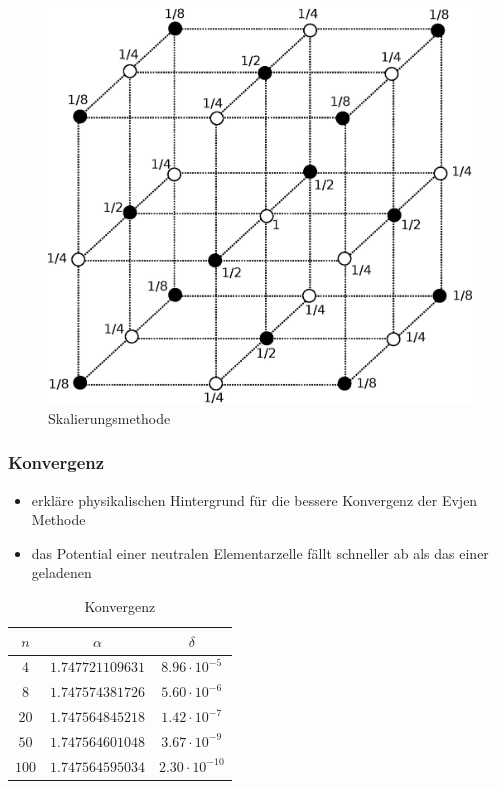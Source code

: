 \documentclass[10pt,a4paper]{article}
\begin{document}
\begin{figure}[h]
	\centering
	\includegraphics[scale = 0.4]{./figures/wuerfel.eps}
	\caption{Skalierungsmethode}
	\label{skalierungsgrafik3d}
\end{figure}
	

\subsubsection{Konvergenz}

\begin{itemize}
\item erkläre physikalischen Hintergrund für die bessere Konvergenz der Evjen
Methode
\item das Potential einer neutralen Elementarzelle fällt schneller ab als das
einer geladenen
\end{itemize}

\begin{table}[h]
\centering
\begin{tabular}{|c|c|c|}
\hline 
\rule[-1ex]{0pt}{2.5ex} $n$ & $\alpha$ & $\delta$ \\ 
\hline 
\rule[-1ex]{0pt}{2.5ex} $4$ & $1.747721109631$ & $8.96\cdot10^{-5}$ \\ 
\hline 
\rule[-1ex]{0pt}{2.5ex} $8$ & $1.747574381726$ & $5.60\cdot10^{-6}$ \\ 
\hline 
\rule[-1ex]{0pt}{2.5ex} $20$ & $1.747564845218$ & $1.42\cdot10^{-7}$ \\ 
\hline 
\rule[-1ex]{0pt}{2.5ex} $50$ & $1.747564601048$ & $3.67\cdot10^{-9}$ \\ 
\hline 
\rule[-1ex]{0pt}{2.5ex} $100$ & $1.747564595034$ & $2.30\cdot10^{-10}$ \\ 
\hline 
\end{tabular} 
\caption{Konvergenz}
\end{table}
\end{document}
